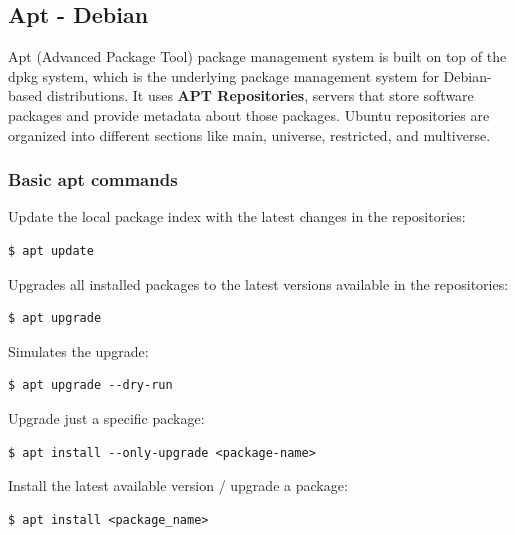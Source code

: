 \documentclass{article}
\newenvironment{codetemplate}[1][]{%
  \mybasecolorbox[#1]
  \itshape
}{%
  \endmybasecolorbox
}
\begin{document}
\subsection{Apt - Debian}

Apt (Advanced Package Tool) package management system is built on top of the dpkg system, which is the underlying package management system for Debian-based distributions. It uses \textbf{APT Repositories}, servers that store software packages and provide metadata about those packages. Ubuntu repositories are organized into different sections like main, universe, restricted, and multiverse.

\subsubsection{Basic apt commands}

Update the local package index with the latest changes in the repositories:
\begin{codetemplate}
\begin{verbatim}
$ apt update
\end{verbatim}
\end{codetemplate}

Upgrades all installed packages to the latest versions available in the repositories:
\begin{codetemplate}
\begin{verbatim}
$ apt upgrade
\end{verbatim}
\end{codetemplate}

Simulates the upgrade:
\begin{codetemplate}
\begin{verbatim}
$ apt upgrade --dry-run
\end{verbatim}
\end{codetemplate}

Upgrade just a specific package:
\begin{codetemplate}
\begin{verbatim}
$ apt install --only-upgrade <package-name>
\end{verbatim}
\end{codetemplate}

Install the latest available version / upgrade a package:
\begin{codetemplate}
\begin{verbatim}
$ apt install <package_name>
\end{verbatim}
\end{codetemplate}
\end{document}
